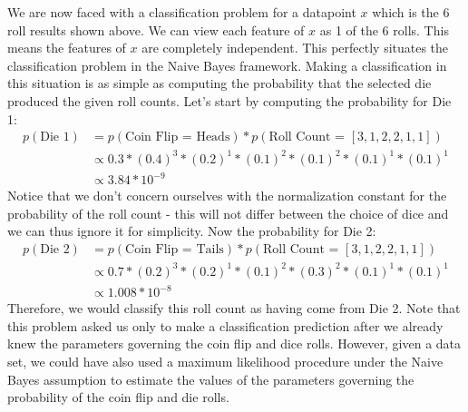 \documentclass[12pt,letterpaper]{article}
\begin{document}
    We are now faced with a classification problem for 
    a datapoint $x$ which is the 6 roll results shown 
    above. We can view each feature of $x$ as 1
    of the 6 rolls. This means the features of 
    $x$ are completely independent. This perfectly
    situates the classification problem in 
	the Naive Bayes framework. Making a classification in this situation is as simple as computing the probability that the selected die produced the given roll counts. Let's start by computing the probability for Die 1:
	\begin{align*}
		p(\text{Die 1}) &= p(\text{Coin Flip = Heads}) * p(\text{Roll Count = }[3,1,2,2,1,1]) \\
		&\propto 0.3 * (0.4)^{3} * (0.2)^{1} * (0.1)^{2} * (0.1)^{2} * (0.1)^{1} * (0.1)^{1} \\
		&\propto 3.84 * 10^{-9}
	\end{align*}
	Notice that we don't concern ourselves with the normalization constant for the probability of the roll count - this will not differ between the choice of dice and we can thus ignore it for simplicity. Now the probability for Die 2:
	\begin{align*}
		p(\text{Die 2}) &= p(\text{Coin Flip = Tails}) * p(\text{Roll Count = }[3,1,2,2,1,1]) \\
		&\propto 0.7 * (0.2)^{3} * (0.2)^{1} * (0.1)^{2} * (0.3)^{2} * (0.1)^{1} * (0.1)^{1} \\
		&\propto 1.008 * 10^{-8}
	\end{align*}
	Therefore, we would classify this roll count as having come from Die 2. \newline \newline
	Note that this problem asked us only to make a classification prediction after we already knew the parameters governing the coin flip and dice rolls. However, given a data set, we could have also used a maximum likelihood procedure under the Naive Bayes assumption to estimate the values of the parameters governing the probability of the coin flip and die rolls.
\end{document}
